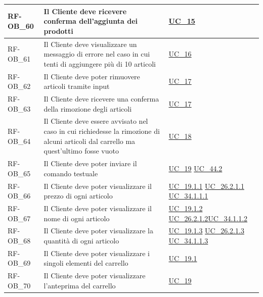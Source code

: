 \begin{longtable}{|>{\raggedright}p{}|>{\raggedright\arraybackslash}p{}|>{\raggedright\arraybackslash}p{}|}
	\hline
	RF-OB\_60 \hypertarget{rf-ob_60} & Il Cliente deve ricevere conferma dell'aggiunta dei prodotti & \hyperref[uc_15]{UC\_15} \\
	\hline
	RF-OB\_61 \hypertarget{rf-ob_61} & Il Cliente deve visualizzare un messaggio di errore nel caso in cui tenti di aggiungere più di 10 articoli & \hyperref[uc_16]{UC\_16} \\
	\hline
	RF-OB\_62 \hypertarget{rf-ob_62} & Il Cliente deve poter rimuovere articoli tramite input & \hyperref[uc_17]{UC\_17} \\
	\hline
	RF-OB\_63 \hypertarget{rf-ob_63} & Il Cliente deve ricevere una conferma della rimozione degli articoli & \hyperref[uc_17]{UC\_17} \\
	\hline
	RF-OB\_64 \hypertarget{rf-ob_64} & Il Cliente deve essere avvisato nel caso in cui richiedesse la rimozione di alcuni articoli dal carrello ma quest'ultimo fosse vuoto & \hyperref[uc_18]{UC\_18} \\
	\hline
	RF-OB\_65 \hypertarget{rf-ob_65} & Il Cliente deve poter inviare il comando testuale \vr{/carrello} & \hyperref[uc_19]{UC\_19} \newline \hyperref[uc_44.2]{UC\_44.2}  \\
	\hline
	RF-OB\_66 \hypertarget{rf-ob_66} & Il Cliente deve poter visualizzare il prezzo di ogni articolo & \hyperref[uc_19.1.1]{UC\_19.1.1} \newline \hyperref[uc_26.2.1.1]{UC\_26.2.1.1} \newline \hyperref[uc_34.1.1.1]{UC\_34.1.1.1} \\
	\hline
	RF-OB\_67 \hypertarget{rf-ob_67} & Il Cliente deve poter visualizzare il nome di ogni articolo & \hyperref[uc_19.1.2]{UC\_19.1.2} \newline \hyperref[uc_26.2.1.2]{UC\_26.2.1.2}\newline \hyperref[uc_34.1.1.2]{UC\_34.1.1.2}\\
	\hline
	RF-OB\_68 \hypertarget{rf-ob_68} & Il Cliente deve poter visualizzare la quantità di ogni articolo & \hyperref[uc_19.1.3]{UC\_19.1.3} \newline \hyperref[uc_26.2.1.3]{UC\_26.2.1.3} \newline \hyperref[uc_34.1.1.3]{UC\_34.1.1.3}\\
	\hline
	RF-OB\_69 \hypertarget{rf-ob_69} & Il Cliente deve poter visualizzare i singoli elementi del carrello & \hyperref[uc_19.1]{UC\_19.1} \\
	\hline
	RF-OB\_70 \hypertarget{rf-ob_70} & Il Cliente deve poter visualizzare l'anteprima del carrello & \hyperref[uc_19]{UC\_19} \\

\end{longtable}
